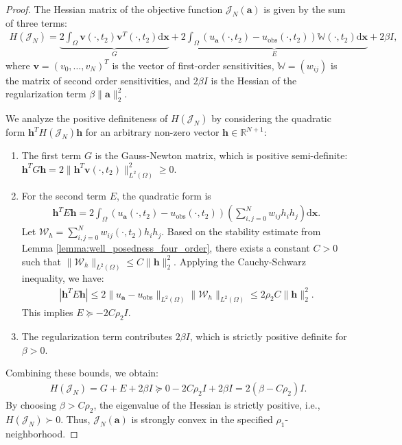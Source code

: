 \documentclass[11pt,reqno]{amsart}
\begin{document}
\begin{proof}
	The Hessian matrix of the objective function $\mathcal{J}_N(\mathbf{a})$ is given by the sum of three terms:
	\begin{align*}
		H(\mathcal{J}_N) = \underbrace{2 \int_{\Omega} \mathbf{v}(\cdot,t_2) \mathbf{v}^T(\cdot,t_2) \mathrm{d}\mathbf{x}}_{G} + \underbrace{2 \int_{\Omega} (u_{\mathbf{a}}(\cdot,t_2) - u_{\text{obs}}(\cdot,t_2)) \mathbb{W}(\cdot,t_2) \mathrm{d}\mathbf{x}}_{E} + 2\beta I,
	\end{align*}
	where $\mathbf{v} = (v_0, \dots, v_N)^T$ is the vector of first-order sensitivities, $\mathbb{W} = (w_{ij})$ is the matrix of second order sensitivities, and $2\beta I$ is the Hessian of the regularization term $\beta \|\mathbf{a}\|_2^2$.
	
	We analyze the positive definiteness of $H(\mathcal{J}_N)$ by considering the quadratic form $\mathbf{h}^T H(\mathcal{J}_N) \mathbf{h}$ for an arbitrary non-zero vector $\mathbf{h} \in \mathbb{R}^{N+1}$:
	\begin{enumerate}
		\item The first term $G$ is the Gauss-Newton matrix, which is positive semi-definite: $\mathbf{h}^T G \mathbf{h} = 2 \|\mathbf{h}^T \mathbf{v}(\cdot,t_2)\|_{L^2(\Omega)}^2 \geq 0$.
		\item For the second term $E$, the quadratic form is 
		\begin{align*}
			\mathbf{h}^T E \mathbf{h} = 2 \int_{\Omega} (u_{\mathbf{a}}(\cdot,t_2) - u_{\text{obs}}(\cdot,t_2)) \left(\sum_{i,j=0}^N w_{ij} h_i h_j\right) \mathrm{d}\mathbf{x}.
		\end{align*}
		Let $\mathcal{W}_h = \sum_{i,j=0}^N w_{ij}(\cdot,t_2) h_i h_j$. Based on the stability estimate from Lemma \ref{lemma:well_posedness_four_order}, there exists a constant $C > 0$ such that $\|\mathcal{W}_h\|_{L^2(\Omega)} \leq C \|\mathbf{h}\|_2^2$. Applying the Cauchy-Schwarz inequality, we have:
		\begin{align*}
			|\mathbf{h}^T E \mathbf{h}| \leq 2 \|u_{\mathbf{a}} - u_{\text{obs}}\|_{L^2(\Omega)} \|\mathcal{W}_h\|_{L^2(\Omega)} \leq 2 \rho_2 C \|\mathbf{h}\|_2^2.
		\end{align*}
		This implies $E \succeq -2C\rho_2 I$.
		\item The regularization term contributes $2\beta I$, which is strictly positive definite for $\beta > 0$.
	\end{enumerate}
	
	Combining these bounds, we obtain:
	\begin{align*}
		H(\mathcal{J}_N) = G + E + 2\beta I \succeq 0 - 2C\rho_2 I + 2\beta I = 2(\beta - C\rho_2) I.
	\end{align*}
	By choosing $\beta > C\rho_2$, the eigenvalue of the Hessian is strictly positive, i.e., $H(\mathcal{J}_N) \succ 0$. Thus, $\mathcal{J}_N(\mathbf{a})$ is strongly convex in the specified $\rho_1$-neighborhood.
\end{proof}
\end{document}

